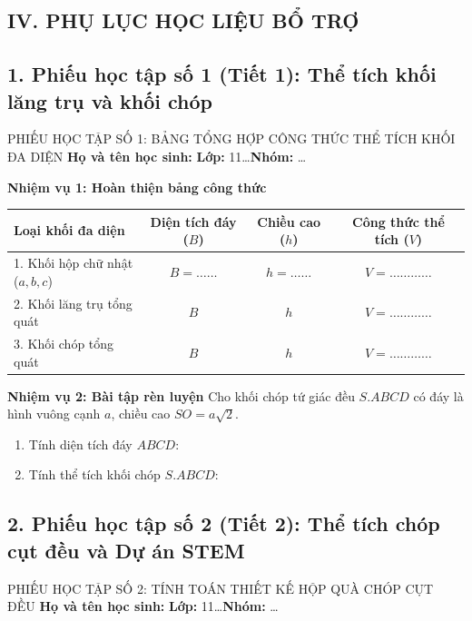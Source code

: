 \documentclass[12pt, a4paper]{article}
\begin{document}
\begin{itemize}[leftmargin=1.2cm]
\section*{IV. PHỤ LỤC HỌC LIỆU BỔ TRỢ}

\subsection*{1. Phiếu học tập số 1 (Tiết 1): Thể tích khối lăng trụ và khối chóp}

\begin{pedabox}{PHIẾU HỌC TẬP SỐ 1: BẢNG TỔNG HỢP CÔNG THỨC THỂ TÍCH KHỐI ĐA DIỆN}
    \textbf{Họ và tên học sinh:} \dotfill \textbf{Lớp:} 11\dots \textbf{Nhóm:} \dots
    
    \textbf{Nhiệm vụ 1: Hoàn thiện bảng công thức}
    \begin{center}
    \begin{tabular}{|l|c|c|c|}
    \hline
    \textbf{Loại khối đa diện} & \textbf{Diện tích đáy ($B$)} & \textbf{Chiều cao ($h$)} & \textbf{Công thức thể tích ($V$)} \\ \hline
    1. Khối hộp chữ nhật ($a, b, c$) & $B = \dots\dots$ & $h = \dots\dots$ & $V = \dots\dots\dots\dots$ \\ \hline
    2. Khối lăng trụ tổng quát & $B$ & $h$ & $V = \dots\dots\dots\dots$ \\ \hline
    3. Khối chóp tổng quát & $B$ & $h$ & $V = \dots\dots\dots\dots$ \\ \hline
    \end{tabular}
    \end{center}

    \textbf{Nhiệm vụ 2: Bài tập rèn luyện}
    Cho khối chóp tứ giác đều $S.ABCD$ có đáy là hình vuông cạnh $a$, chiều cao $SO = a\sqrt{2}$.
    \begin{enumerate}
        \item Tính diện tích đáy $ABCD$: \dotfill
        \item Tính thể tích khối chóp $S.ABCD$: \dotfill
    \end{enumerate}
\end{pedabox}

\subsection*{2. Phiếu học tập số 2 (Tiết 2): Thể tích chóp cụt đều và Dự án STEM}

\begin{pedabox}{PHIẾU HỌC TẬP SỐ 2: TÍNH TOÁN THIẾT KẾ HỘP QUÀ CHÓP CỤT ĐỀU}
    \textbf{Họ và tên học sinh:} \dotfill \textbf{Lớp:} 11\dots \textbf{Nhóm:} \dots


\end{pedabox}
\end{itemize}
\end{document}
